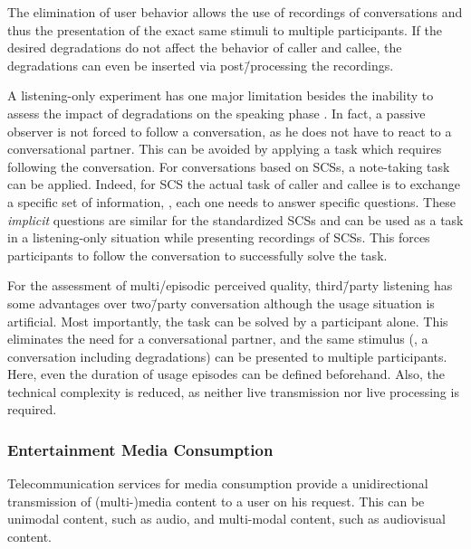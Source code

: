 The elimination of user behavior allows the use of recordings of conversations and thus the presentation of the exact same stimuli to multiple participants.
If the desired degradations do not affect the behavior of caller and callee, the degradations can even be inserted via post\=/processing the recordings.

A listening-only experiment has one major limitation besides the inability to assess the impact of degradations on the speaking phase \citep{gueguin_evaluation_2008}.
In fact, a passive observer is not forced to follow a conversation, as he does not have to react to a conversational partner.
This can be avoided by applying a task which requires following the conversation.
For conversations based on \acp{SCS}, a note-taking task can be applied.
Indeed, for \ac{SCS} the actual task of caller and callee is to exchange a specific set of information, \ie, each one needs to answer specific questions.
These \emph{implicit} questions are similar for the standardized \acp{SCS} and can be used as a task in a listening-only situation while presenting recordings of \acp{SCS}.
This forces participants to follow the conversation to successfully solve the task.

For the assessment of multi\-/episodic perceived quality, third\=/party listening has some advantages over two\=/party conversation although the usage situation is artificial.
Most importantly, the task can be solved by a participant alone.
This eliminates the need for a conversational partner, and the same stimulus (\ie, a conversation including degradations) can be presented to multiple participants.
Here, even the duration of usage episodes can be defined beforehand.
Also, the technical complexity is reduced, as neither live transmission nor live processing is required.

\subsubsection*{Entertainment Media Consumption}
Telecommunication services for media consumption provide a unidirectional transmission of (multi-)media content to a user on his request.
This can be unimodal content, such as audio, and multi-modal content, such as audiovisual content.


